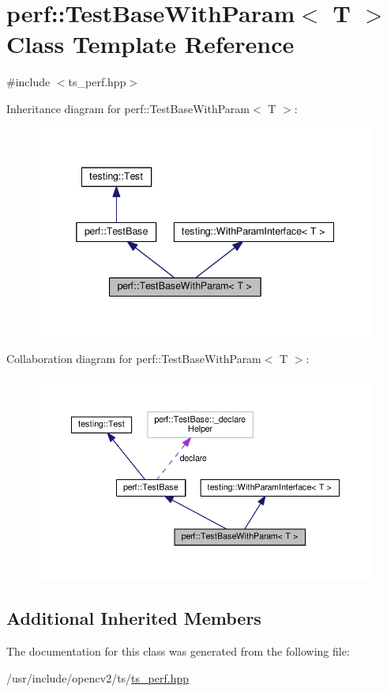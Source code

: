 \hypertarget{classperf_1_1TestBaseWithParam}{\section{perf\-:\-:Test\-Base\-With\-Param$<$ T $>$ Class Template Reference}
\label{classperf_1_1TestBaseWithParam}
}


{\ttfamily \#include $<$ts\-\_\-perf.\-hpp$>$}



Inheritance diagram for perf\-:\-:Test\-Base\-With\-Param$<$ T $>$\-:\nopagebreak
\begin{figure}[H]
\begin{center}
\leavevmode
\includegraphics[width=341pt]{classperf_1_1TestBaseWithParam__inherit__graph}
\end{center}
\end{figure}


Collaboration diagram for perf\-:\-:Test\-Base\-With\-Param$<$ T $>$\-:\nopagebreak
\begin{figure}[H]
\begin{center}
\leavevmode
\includegraphics[width=350pt]{classperf_1_1TestBaseWithParam__coll__graph}
\end{center}
\end{figure}
\subsection*{Additional Inherited Members}


The documentation for this class was generated from the following file\-:\begin{DoxyCompactItemize}
\item 
/usr/include/opencv2/ts/\hyperlink{ts__perf_8hpp}{ts\-\_\-perf.\-hpp}\end{DoxyCompactItemize}
